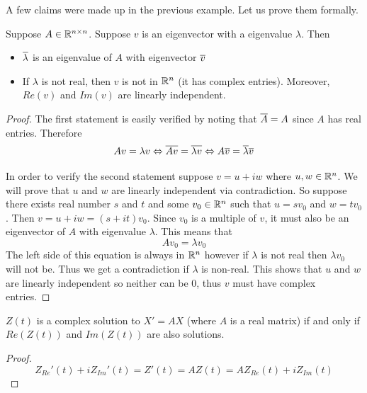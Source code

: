 A few claims were made up in the previous example. Let us prove them formally.
\begin{lemma}\label{lem:complexification}
Suppose $A \in \mathbb{R}^{n \times n}$. Suppose $v$ is an eigenvector with a eigenvalue $\lambda$. Then
\begin{itemize}
    \item $\overline{\lambda}$ is an eigenvalue of $A$ with eigenvector $\overline{v}$
    \item If $\lambda$ is not real, then $v$ is not in $\mathbb{R}^{n}$ (it has complex entries). Moreover, $Re(v)$ and $Im(v)$ are linearly independent.
\end{itemize}
\end{lemma}
\begin{proof}
The first statement is easily verified by noting that $\overline{A} = A$ since $A$ has real entries. Therefore
$$ Av = \lambda v \Leftrightarrow \overline{Av} = \overline{\lambda v} \Leftrightarrow A\overline{v} = \overline{\lambda} \overline{v} $$

In order to verify the second statement suppose $v = u + iw$ where $u, w \in \mathbb{R}^n$. We will prove that $u$ and $w$ are linearly independent via contradiction. So suppose there exists real number $s$ and $t$ and some $v_0 \in \mathbb{R}^n$ such that $u = s v_0$ and $w = t v_0$. Then $v = u + iw = (s + it) v_0$. Since $v_0$ is a multiple of $v$, it must also be an eigenvector of $A$ with eigenvalue $\lambda$. This means that
$$ Av_0 = \lambda v_0 $$
The left side of this equation is always in $\mathbb{R}^n$ however if $\lambda$ is not real then $\lambda v_0$ will not be. Thus we get a contradiction if $\lambda$ is non-real. This shows that $u$ and $w$ are linearly independent so neither can be 0, thus $v$ must have complex entries.
\end{proof}
\begin{lemma}
$Z(t)$ is a complex solution to $X' = AX$ (where $A$ is a real matrix) if and only if $Re(Z(t))$ and $Im(Z(t))$ are also solutions.
\end{lemma}
\begin{proof}
$$ Z_{Re}'(t) + i Z_{Im}'(t) = Z'(t) = A Z(t) = A Z_{Re}(t) + i Z_{Im}(t) $$
\end{proof}